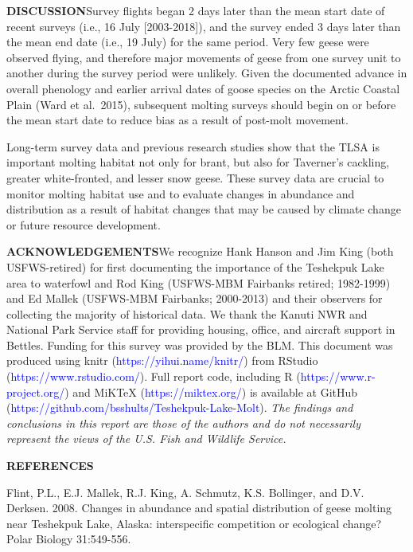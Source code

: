 \documentclass[
]{article}
\begin{document}
\textbf{DISCUSSION}\newline Survey flights began 2 days later than the
mean start date of recent surveys (i.e., 16 July {[}2003-2018{]}), and
the survey ended 3 days later than the mean end date (i.e., 19 July) for
the same period. Very few geese were observed flying, and therefore
major movements of geese from one survey unit to another during the
survey period were unlikely. Given the documented advance in overall
phenology and earlier arrival dates of goose species on the Arctic
Coastal Plain (Ward et al.~2015), subsequent molting surveys should
begin on or before the mean start date to reduce bias as a result of
post-molt movement.

Long-term survey data and previous research studies show that the TLSA
is important molting habitat not only for brant, but also for Taverner's
cackling, greater white-fronted, and lesser snow geese. These survey
data are crucial to monitor molting habitat use and to evaluate changes
in abundance and distribution as a result of habitat changes that may be
caused by climate change or future resource development.

\textbf{ACKNOWLEDGEMENTS}\newline We recognize Hank Hanson and Jim King
(both USFWS-retired) for first documenting the importance of the
Teshekpuk Lake area to waterfowl and Rod King (USFWS-MBM Fairbanks
retired; 1982-1999) and Ed Mallek (USFWS-MBM Fairbanks; 2000-2013) and
their observers for collecting the majority of historical data. We thank
the Kanuti NWR and National Park Service staff for providing housing,
office, and aircraft support in Bettles. Funding for this survey was
provided by the BLM. This document was produced using knitr
(\textcolor{blue}{https://yihui.name/knitr/}) from RStudio
(\textcolor{blue}{https://www.rstudio.com/}). Full report code,
including R (\textcolor{blue}{https://www.r-project.org/}) and MiKTeX
(\textcolor{blue}{https://miktex.org/}) is available at GitHub
(\textcolor{blue}{https://github.com/bsshults/Teshekpuk-Lake-Molt}).
\newline
\textit{\small{The findings and conclusions in this report are those of the authors and do not necessarily represent the views of the U.S. Fish and Wildlife Service.}}

\textbf{REFERENCES}

\setlength{\parindent}{-0.2in}
\setlength{\leftskip}{0.2in}
\setlength{\parskip}{1ex}

Flint, P.L., E.J. Mallek, R.J. King, A. Schmutz, K.S. Bollinger, and
D.V. Derksen. 2008. Changes in abundance and spatial distribution of
geese molting near Teshekpuk Lake, Alaska: interspecific competition or
ecological change? Polar Biology 31:549-556.
\end{document}
